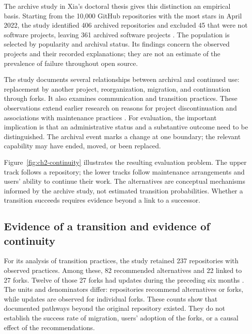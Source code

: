 The archive study in Xia's doctoral thesis gives this distinction an empirical basis. Starting from the 10,000 GitHub repositories with the most stars in April 2022, the study identified 406 archived repositories and excluded 45 that were not software projects, leaving 361 archived software projects \citep[Chapter 4]{xia2024thesis}. The population is selected by popularity and archival status. Its findings concern the observed projects and their recorded explanations; they are not an estimate of the prevalence of failure throughout open source.

The study documents several relationships between archival and continued use: replacement by another project, reorganization, migration, and continuation through forks. It also examines communication and transition practices. These observations extend earlier research on reasons for project discontinuation and associations with maintenance practices \citep{coelho2017}. For evaluation, the important implication is that an administrative status and a substantive outcome need to be distinguished. The archival event marks a change at one boundary; the relevant capability may have ended, moved, or been replaced.

Figure~\ref{fig:ch2-continuity} illustrates the resulting evaluation problem. The upper track follows a repository; the lower tracks follow maintenance arrangements and users' ability to continue their work. The alternatives are conceptual mechanisms informed by the archive study, not estimated transition probabilities. Whether a transition succeeds requires evidence beyond a link to a successor.



\subsection{Evidence of a transition and evidence of continuity}
For its analysis of transition practices, the study retained 237 repositories with observed practices. Among these, 82 recommended alternatives and 22 linked to 27 forks. Twelve of those 27 forks had updates during the preceding six months \citep[Section 4.3.2]{xia2024thesis}. The units and denominators differ: repositories recommend alternatives or forks, while updates are observed for individual forks. These counts show that documented pathways beyond the original repository existed. They do not establish the success rate of migration, users' adoption of the forks, or a causal effect of the recommendations.

